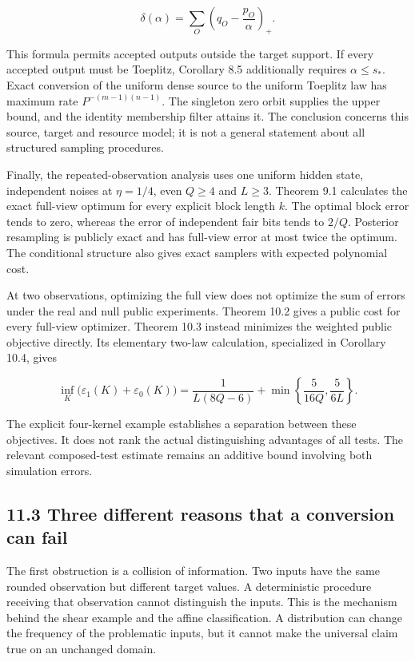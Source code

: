 \documentclass[
]{article}
\begin{document}
\[
\delta(\alpha)=\sum_O\left(q_O-\frac{p_O}{\alpha}\right)_+.
\]

This formula permits accepted outputs outside the target support. If
every accepted output must be Toeplitz, Corollary 8.5 additionally
requires \(\alpha\le s_*\). Exact conversion of the uniform dense source
to the uniform Toeplitz law has maximum rate \(P^{-(m-1)(n-1)}\). The
singleton zero orbit supplies the upper bound, and the identity
membership filter attains it. The conclusion concerns this source,
target and resource model; it is not a general statement about all
structured sampling procedures.

Finally, the repeated-observation analysis uses one uniform hidden
state, independent noises at \(\eta=1/4\), even \(Q\ge4\) and \(L\ge3\).
Theorem 9.1 calculates the exact full-view optimum for every explicit
block length \(k\). The optimal block error tends to zero, whereas the
error of independent fair bits tends to \(2/Q\). Posterior resampling is
publicly exact and has full-view error at most twice the optimum. The
conditional structure also gives exact samplers with expected polynomial
cost.

At two observations, optimizing the full view does not optimize the sum
of errors under the real and null public experiments. Theorem 10.2 gives
a public cost for every full-view optimizer. Theorem 10.3 instead
minimizes the weighted public objective directly. Its elementary two-law
calculation, specialized in Corollary 10.4, gives

\[
\inf_K\bigl(\varepsilon_1(K)+\varepsilon_0(K)\bigr)
=\frac1{L(8Q-6)}+\min\left\{\frac5{16Q},\frac5{6L}\right\}.
\]

The explicit four-kernel example establishes a separation between these
objectives. It does not rank the actual distinguishing advantages of all
tests. The relevant composed-test estimate remains an additive bound
involving both simulation errors.

\subsection{11.3 Three different reasons that a conversion can
fail}\label{three-different-reasons-that-a-conversion-can-fail}

The first obstruction is a collision of information. Two inputs have the
same rounded observation but different target values. A deterministic
procedure receiving that observation cannot distinguish the inputs. This
is the mechanism behind the shear example and the affine classification.
A distribution can change the frequency of the problematic inputs, but
it cannot make the universal claim true on an unchanged domain.
\end{document}
